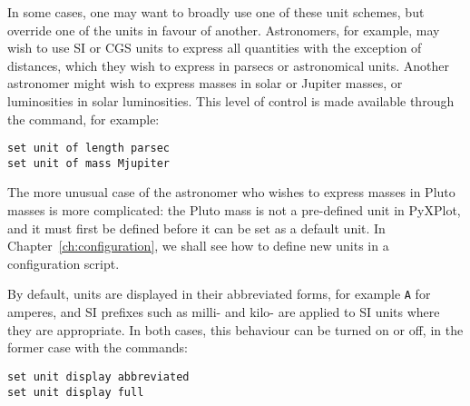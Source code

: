 \begin{table}
\caption{A list of PyXPlot's unit schemes.}
\label{tab:unit_schemes}
\end{table}

In some cases, one may want to broadly use one of these unit schemes, but
override one of the units in favour of another.  Astronomers, for example, may
wish to use SI or CGS units to express all quantities with the exception of
distances, which they wish to express in parsecs or astronomical units. Another
astronomer might wish to express masses in solar or Jupiter masses, or
luminosities in solar luminosities. This level of control is made available
through the  command, for example:

\begin{verbatim}
set unit of length parsec
set unit of mass Mjupiter
\end{verbatim}

The more unusual case of the astronomer who wishes to express masses in Pluto
masses is more complicated: the Pluto mass is not a pre-defined unit in
PyXPlot, and it must first be defined before it can be set as a default unit.
In Chapter~\ref{ch:configuration}, we shall see how to define new units in a
configuration script.

By default, units are displayed in their abbreviated forms, for example {\tt A} for amperes, and SI prefixes such as milli- and kilo- are applied to SI units where they are appropriate. In both cases, this behaviour
can be turned on or off, in the former case with the commands:

\begin{verbatim}
set unit display abbreviated
set unit display full
\end{verbatim}

